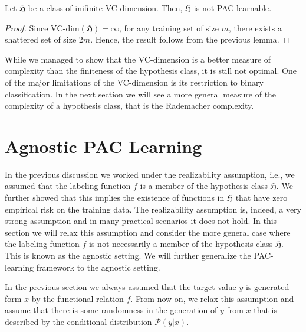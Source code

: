 	\begin{coro}
	Let $\mathfrak{H}$ be a class of inifinite VC-dimension. Then,
	$\mathfrak{H}$ is not PAC learnable.
	\end{coro}
\begin{proof}
	Since $\text{VC-dim}(\mathfrak{H})=\infty$, for any training set of size
	$m$, there exists a shattered set of size $2m$. Hence, the result follows
	from the previous lemma.
\end{proof}
While we managed to show that the VC-dimension is a better measure of complexity
than the finiteness of the hypothesis class, it is still not optimal. One of the
major limitations of the VC-dimension is its restriction to binary
classification. In the next section we will see a more general measure of the
complexity of a hypothesis class, that is the Rademacher complexity.
\section{Agnostic PAC Learning}
In the previous discussion we worked under the realizability assumption, i.e., we assumed that the labeling function $f$ is a member
of the hypothesis class $\mathfrak{H}$. We further showed that this implies the
existence of functions in $\mathfrak{H}$ that have zero empirical risk on the
training data. The realizability assumption is, indeed, a very strong
assumption and in many practical scenarios it does not hold. In this section we
will relax this assumption and consider the more general case where the labeling
function $f$ is not necessarily a member of the hypothesis class $\mathfrak{H}$.
This is known as the agnostic setting. We will further generalize the
PAC-learning framework to the agnostic setting.

In the previous section we always assumed that the target value $y$ is generated form $x$ by the
functional relation $f$. From now on, we relax this assumption and assume that
there is some randomness in the generation of $y$ from $x$ that is described by
the conditional distribution $\mathcal{P}(y|x)$. 

